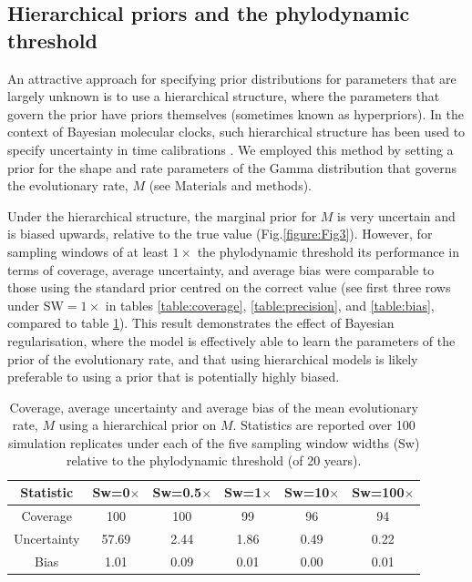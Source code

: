 \documentclass[11pt]{article}
\begin{document}
\subsection{Hierarchical priors and the phylodynamic threshold}
An attractive approach for specifying prior distributions for parameters that are largely unknown is to use a hierarchical structure, where the parameters that govern the prior have priors themselves (sometimes known as hyperpriors). In the context of Bayesian molecular clocks, such hierarchical structure has been used to specify uncertainty in time calibrations \citep{heath2014fossilized}. We employed this method by setting a prior for the shape and rate parameters of the Gamma distribution that governs the evolutionary rate, $M$ (see Materials and methods). 

Under the hierarchical structure, the marginal prior for $M$ is very uncertain and is biased upwards, relative to the true value (Fig.\ref{figure:Fig3}). However, for sampling windows of at least $1\times$ the phylodynamic threshold its performance in terms of coverage, average uncertainty, and average bias were comparable to those using the standard prior centred on the correct value (see first three rows under SW$=1\times$ in tables \ref{table:coverage}, \ref{table:precision}, and \ref{table:bias}, compared to table \ref{table:hyper}). This result demonstrates the effect of Bayesian regularisation, where the model is effectively able to learn the parameters of the prior of the evolutionary rate, and that using hierarchical models is likely preferable to using a prior that is potentially highly biased. 

\begin{table}[H]
	\caption{Coverage, average uncertainty and average bias of the mean evolutionary rate, $M$ using a hierarchical prior on $M$. Statistics are reported over 100 simulation replicates under each of the five sampling window widths (Sw) relative to the phylodynamic threshold (of 20 years).} 
	\begin{center}
		\label{table:hyper}
		\begin{tabular}{ c|c|c|c|c|c }
			Statistic & Sw=0$\times$ & Sw=0.5$\times$ & Sw=1$\times$ & Sw=10$\times$ & Sw=100$\times$ \\
			\hline
			Coverage    & 100   & 100  & 99   & 96   & 94\\
			Uncertainty & 57.69 & 2.44 & 1.86 & 0.49 & 0.22\\
			Bias        & 1.01  & 0.09 & 0.01 & 0.00 & 0.01\\
		\end{tabular}
	\end{center}
\end{table}
\end{document}
